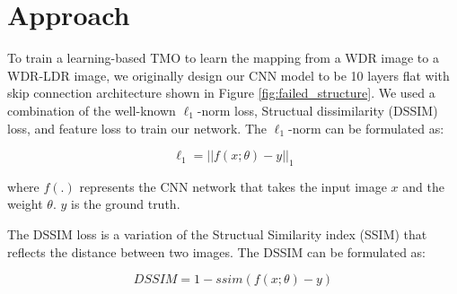 \documentclass[journal]{IEEEtran}
\begin{document}
\section{Approach}
To train a learning-based TMO to learn the mapping from a WDR image to a WDR-LDR image, we originally design our CNN model to be 10 layers flat with skip connection architecture shown in Figure \ref{fig:failed_structure}.  We used a combination of the well-known $\ell_1$-norm loss, Structual dissimilarity (DSSIM) \cite{loza2006structural} loss, and feature loss \cite{johnson2016perceptual} to train our network.  The $\ell_1$-norm can be formulated as:

\begin{equation}
    \ell_1 = ||f(x;\theta) - y||_1
\end{equation}

where $f(.)$ represents the CNN network that takes the input image $x$ and the weight $\theta$.  $y$ is the ground truth. 

The DSSIM loss is a variation of the Structual Similarity index (SSIM) \cite{Wang2004Image} that reflects the distance between two images. The DSSIM can be formulated as:

\begin{equation}
    DSSIM = 1 - ssim(f(x;\theta) - y)
\end{equation}
\end{document}
